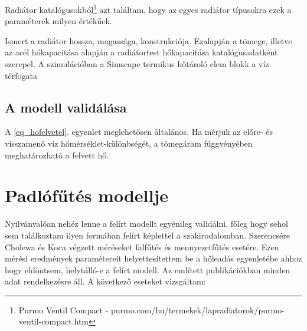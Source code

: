 Radiátor katalógusokból\footnote{Purmo Ventil Compact - purmo.com/hu/termekek/lapradiatorok/purmo-ventil-compact.htm} azt találtam, hogy az egyes radiátor típusokra ezek a paraméterek milyen értékűek.




Ismert a radiátor hossza, magassága, konstrukciója. Ezalapján a
tömege, illetve az acél hőkapacitása alapján a radiátortest hőkapacitása katalógusadatként szerepel.
A szimulációban a  Simscape termikus hőtároló elem blokk a víz térfogata%

\subsection{A modell validálása}

A \ref{eq_hofelvetel}. egyenlet meglehetősen általános. Ha mérjük az előre- és visszamenő víz hőmérséklet-különbségét, a tömegáram függvényében meghatározható a felvett hő.


\section{Padlófűtés modellje}

Nyilvánvalóan nehéz lenne a felírt modellt egyénileg validálni, főleg hogy sehol sem találkoztam ilyen formában felírt képlettel a szakirodalomban. Szerencsére Cholewa \cite{CHOLEWA2013599} és Koca \cite{Koca} végzett méréseket falfűtés és mennyezetfűtés esetére. Ezen mérési eredmények paramétereit helyettesítettem be a hőleadás egyenletébe ahhoz hogy eldöntsem, helytálló-e a felírt modell. Az említett publikációkban minden adat rendelkezésre áll. A következő eseteket vizsgáltam:

